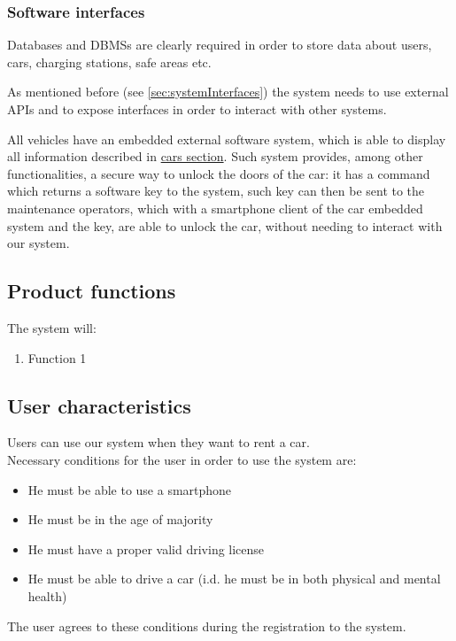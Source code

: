 \subsubsection{Software interfaces}
Databases and DBMSs are clearly required in order to store data about users, cars, charging stations, safe areas etc.

As mentioned before (see \autoref{sec:systemInterfaces}) the system needs to use external APIs and to expose interfaces in order to interact with other systems.

All vehicles have an embedded external software system, which is able to display all information described in \hyperref[sec:cars]{cars section}. Such system provides, among other functionalities, a secure way to unlock the doors of the car: it has a command which returns a software key to the system, such key can then be sent to the maintenance operators, which with a smartphone client of the car embedded system and the key, are able to unlock the car, without needing to interact with our system.

\subsection{Product functions}
	The system will:
	\begin{enumerate}[label=\textbf{F\arabic*.}]
		\item Function 1
	\end{enumerate}

\subsection{User characteristics}
	Users can use our system when they want to rent a car.\\
	Necessary conditions for the user in order to use the system are:
	\begin{itemize}
		\item He must be able to use a smartphone
		\item He must be in the age of majority
		\item He must have a proper valid driving license
		\item He must be able to drive a car (i.d. he must be in both physical and mental health)
	\end{itemize}
	The user agrees to these conditions during the registration to the system.

